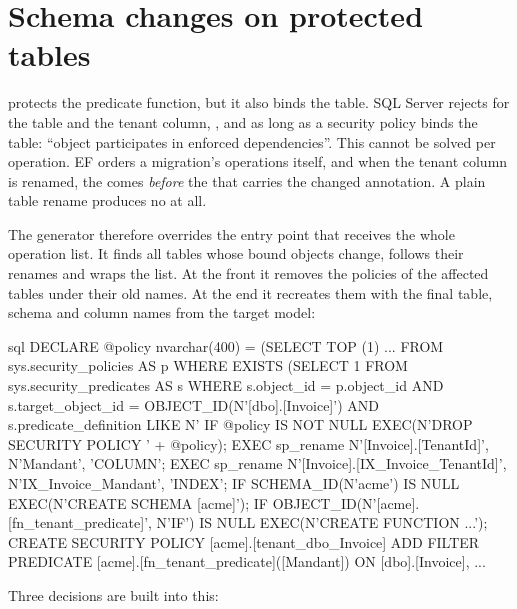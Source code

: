 \section{Schema changes on protected tables}\label{sec:sqlserver-schema-bound-changes}

 protects the predicate function, but it also binds the table. SQL Server
rejects  for the table and the tenant column, ,  and 
as long as a security policy binds the table: “object participates in enforced dependencies”.
This cannot be solved per operation. EF orders a migration's operations itself, and when the
tenant column is renamed, the  comes
\emph{before} the  that carries the changed
annotation. A plain table rename produces no 
at all.

The generator therefore overrides the entry point that receives the whole operation list. It
finds all tables whose bound objects change, follows their renames and wraps the list. At the
front it removes the policies of the affected tables under their old names. At the end it
recreates them with the final table, schema and column names from the target model:

\begin{sourcecode}{sql}
DECLARE @policy nvarchar(400) = (SELECT TOP (1) ... FROM sys.security_policies AS p
    WHERE EXISTS (SELECT 1 FROM sys.security_predicates AS s WHERE s.object_id = p.object_id
        AND s.target_object_id = OBJECT_ID(N'[dbo].[Invoice]')
        AND s.predicate_definition LIKE N'%
IF @policy IS NOT NULL EXEC(N'DROP SECURITY POLICY ' + @policy);
EXEC sp_rename N'[Invoice].[TenantId]', N'Mandant', 'COLUMN';
EXEC sp_rename N'[Invoice].[IX_Invoice_TenantId]', N'IX_Invoice_Mandant', 'INDEX';
IF SCHEMA_ID(N'acme') IS NULL EXEC(N'CREATE SCHEMA [acme]');
IF OBJECT_ID(N'[acme].[fn_tenant_predicate]', N'IF') IS NULL EXEC(N'CREATE FUNCTION ...');
CREATE SECURITY POLICY [acme].[tenant_dbo_Invoice]
    ADD FILTER PREDICATE [acme].[fn_tenant_predicate]([Mandant]) ON [dbo].[Invoice], ...
\end{sourcecode}

Three decisions are built into this:

